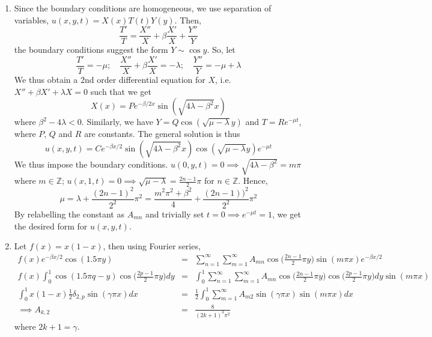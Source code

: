 \documentclass[a4paper]{article}
\begin{document}
\begin{ans}\leavevmode
\begin{enumerate}[label=(\alph*)]
    \item Since the boundary conditions are homogeneous, we use separation of variables, $u(x,y,t)=X(x)T(t)Y(y)$. Then,
$$\frac{T'}{T}=\frac{X''}{X}+\beta\frac{X'}{X}+\frac{Y''}{Y}$$
the boundary conditions suggest the form $Y\sim\cos y$. So, let
$$\frac{T'}{T}=-\mu;\quad \frac{X''}{X}+\beta\frac{X'}{X}=-\lambda;\quad \frac{Y''}{Y}=-\mu+\lambda$$
We thus obtain a 2nd order differential equation for $X$, i.e. $X''+\beta X'+\lambda X=0$ such that we get
$$X(x)=Pe^{-\beta/2x}\sin(\sqrt{4\lambda-\beta^2}x)$$
where $\beta^2-4\lambda<0$. Similarly, we have $Y=Q\cos(\sqrt{\mu-\lambda}y)$ and $T=Re^{-\mu t}$, where $P$, $Q$ and $R$ are constants. The general solution is thus
$$u(x,y,t)=Ce^{-\beta x/2}\sin(\sqrt{4\lambda-\beta^2}x)\cos(\sqrt{\mu-\lambda}y)e^{-\mu t}$$
We thus impose the boundary conditions. $u(0,y,t)=0\implies\sqrt{4\lambda-\beta^2}=m\pi$ where $m\in\mathbb{Z}$; $u(x,1,t)=0\implies\sqrt{\mu-\lambda}=\frac{2n-1}{2}\pi$ for $n\in\mathbb{Z}$. Hence, $$\mu=\lambda+\frac{(2n-1)^2}{2^2}\pi^2=\frac{m^2\pi^2+\beta^2}{4}+\frac{(2n-1))^2}{2^2}\pi^2$$ By relabelling the constant as $A_{mn}$ and trivially set $t=0\implies e^{-\mu t}=1$, we get the desired form for $u(x,y,t)$.
\item Let $f(x)=x(1-x)$, then using Fourier series,
\begin{eqnarray}
f(x)e^{-\beta x/2}\cos(1.5\pi y)&=&\sum_{n=1}^\infty\sum_{m=1}^\infty A_{mn}\cos\bigg(\frac{2n-1}{2}\pi y\bigg)\sin(m\pi x)e^{-\beta x/2}\nonumber\\
f(x)\int_0^1\cos(1.5\pi q-y)\cos\bigg(\frac{2p-1}{2}\pi y\bigg)dy&=&\int_0^1\sum_{n=1}^\infty\sum_{m=1}^\infty A_{mn}\cos\bigg(\frac{2n-1}{2}\pi y\bigg)\cos\bigg(\frac{2p-1}{2}\pi y\bigg)dy\sin(m\pi x)\nonumber\\
\int_0^1x(1-x)\frac{1}{2}\delta_{2,p}\sin(\gamma\pi x)dx&=&\frac{1}{2}\int_0^1\sum_{m=1}^\infty A_{m2}\sin(\gamma \pi x)\sin(m\pi x)dx\nonumber\\\implies A_{k,2}&=&\frac{8}{(2k+1)^3\pi^2}\nonumber
\end{eqnarray}
where $2k+1=\gamma$.
\end{enumerate}
\end{ans}
\newpage
\end{document}
